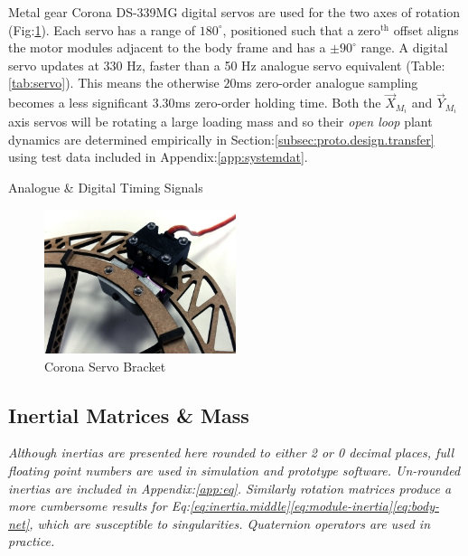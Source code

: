 \par
Metal gear Corona DS-339MG digital servos are used for the two axes of rotation (Fig:\ref{fig:motor-servo}). Each servo has a range of $180^{\circ}$, positioned such that a $\text{zero}^{\text{th}}$ offset aligns the motor modules  adjacent to the body frame and has a $\pm 90^{\circ}$ range. A digital servo updates at 330 Hz, faster than a 50 Hz analogue servo equivalent (Table:\ref{tab:servo}). This means the otherwise $20$ms zero-order analogue sampling becomes a less significant $3.30$ms zero-order holding time. Both the $\vec{X}_{M_i}$ and $\vec{Y}_{M_i}$ axis servos will be rotating a large loading mass and so their \emph{open loop} plant dynamics are determined empirically in Section:\ref{subsec:proto.design.transfer} using test data included in Appendix:\ref{app:systemdat}.
\begin{table}[h]
\centering
{}
\caption{Analogue \& Digital Timing Signals}
\label{tab:servo}
\end{table}
\begin{figure}[htbp]
\centering
\includegraphics[width=0.5\textwidth]{figs/motor-servo}
\caption{Corona Servo Bracket}
\label{fig:motor-servo}
\end{figure}
\subsection{Inertial Matrices \& Mass}
\label{subsec:proto.design.inertia}
\emph{\color{Gray} Although inertias are presented here rounded to either 2 or 0 decimal places, full floating point numbers are used in simulation and prototype software. Un-rounded inertias are included in Appendix:\ref{app:eq}. Similarly rotation matrices produce a more cumbersome results for Eq:\ref{eq:inertia.middle}\ref{eq:module-inertia}\ref{eq:body-net}, which are susceptible to singularities. Quaternion operators are used in practice.}
